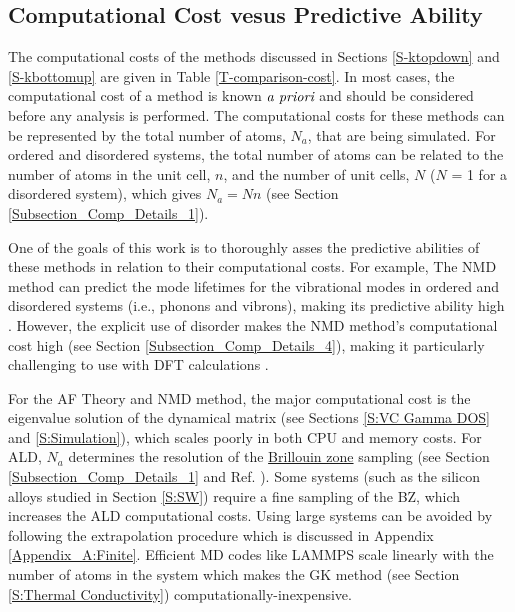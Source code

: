 \subsection{\label{S-CompCost}
Computational Cost vesus Predictive Ability}

The computational costs of the methods discussed in Sections 
\ref{S-ktopdown} and \ref{S-kbottomup}  
are given in Table \ref{T-comparison-cost}.  
In most cases, the 
computational cost of a method is known $\emph{a priori}$ and should 
be considered before any analysis is performed. The computational 
costs for these methods can be represented by the total number of 
atoms, $N_a$, that are being simulated. For ordered and disordered 
systems, the total 
number of atoms can be related to the number of atoms in the unit 
cell, $n$, and the 
number of unit cells, $N$ ($N$ = 1 for a disordered system), 
which gives $N_a = N n$ (see Section \ref{Subsection_Comp_Details_1}).

One of the goals 
of this work is to thoroughly asses the predictive 
abilities of these methods in relation to their computational costs. 
For example, 
The NMD method can predict the mode lifetimes for the vibrational 
modes in ordered and disordered systems (i.e., phonons and vibrons), 
making its predictive ability high 
\cite{ladd_lattice_1986,mcgaughey_quantitative_2004,donadio_thermal_2007,
henry_spectral_2008,donadio_atomistic_2009,turney_predicting_2009,
goicochea_thermal_2010,he_morphology_2011,he_thermal_2011,he_heat_2011,
he_lattice_2012,sosso_thermal_2012,qiu_molecular_2012,wang_mode-wise_2013}. 
However, the explicit use of disorder makes the NMD method's 
computational cost high (see Section \ref{Subsection_Comp_Details_4}), 
making it particularly challenging to use with DFT calculations 
\cite{koker_thermal_2009,huang_filler-reduced_2010,
huang_ab_2008,luo_molecular_2011,esfarjani_heat_2011,
shiomi_thermal_2011}. 

For the AF Theory and NMD method, the major computational cost is the 
eigenvalue solution of the dynamical matrix 
(see Sections \ref{S:VC Gamma DOS} and \ref{S:Simulation}), which scales 
poorly in both CPU and memory costs. 
For ALD, $N_a$ determines the resolution of the 
\href{https://en.wikipedia.org/wiki/Brillouin_zone}
{Brillouin zone} sampling (see Section \ref{Subsection_Comp_Details_1} 
and Ref. ). Some systems (such as 
the silicon alloys studied in Section \ref{S:SW}) 
require a fine sampling 
of the BZ, which increases the ALD computational costs. Using large 
systems can be avoided by following the extrapolation procedure 
which is discussed in Appendix \ref{Appendix_A:Finite}.
Efficient MD 
codes like LAMMPS scale linearly with the number of atoms in 
the system which makes the GK method (see Section 
\ref{S:Thermal Conductivity}) 
computationally-inexpensive.
 
